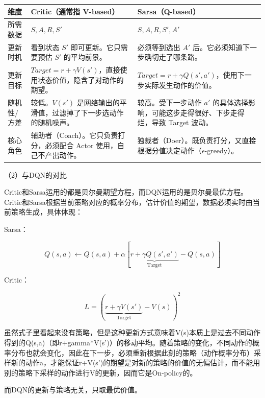 \begin{longtable}[]{@{}
  >{\raggedright\arraybackslash}p{}
  >{\raggedright\arraybackslash}p{}
  >{\raggedright\arraybackslash}p{}@{}}
\toprule
维度 & Critic（通常指 V-based） & Sarsa（Q-based） \\
\midrule
\endhead
所需数据 & \(S,A,R,S'\) & \(S,A,R,S',A'\) \\
更新时机 & 看到状态 \(S'\) 即可更新。它只需要预估 \(S'\) 的平均前景。 & 必须等到选出 \(A'\) 后。它必须知道下一步确切走了哪条路。 \\
更新目标 & \(Target=r+\gamma V(s')\)，直接使用状态价值，隐含了对动作的期望。 & \(Target=r+\gamma Q(s',a')\)，使用下一步实际发生动作的价值。 \\
随机性/方差 & 较低。\(V(s')\) 是网络输出的平滑值，过滤掉了下一步选动作的随机噪声。 & 较高。受下一步动作 \(a'\) 的具体选择影响，可能这步走得很好、下步走得烂，导致 Target 波动。 \\
核心角色 & 辅助者（Coach）。它只负责打分，必须配合 Actor 使用，自己不产出动作。 & 独裁者（Doer）。既负责打分，又直接根据分值决定动作（\(\epsilon\)-greedy）。 \\
\bottomrule
\end{longtable}

（2）与DQN的对比

Critic和Sarsa运用的都是贝尔曼期望方程，而DQN运用的是贝尔曼最优方程。Critic和Sarsa根据当前策略对应的概率分布，估计价值的期望，数据必须实时由当前策略生成，具体体现：

Sarsa：

\[
Q(s,a)\leftarrow Q(s,a)+\alpha\left[\underbrace{r+\gamma Q(s',a')}_{\text{Target}}-Q(s,a)\right]
\]

Critic：

\[
L=\left(\underbrace{r+\gamma V(s')}_{\text{Target}}-V(s)\right)^2
\]

虽然式子里看起来没有策略，但是这种更新方式意味着V(s)本质上是过去不同动作得到的Q(s,a)（即r+gamma*V(s')）的移动平均。随着策略的变化，不同动作的概率分布也就会变化，因此在下一步，必须重新根据此刻的策略（动作概率分布）采样新的动作a，才能保证r+V(s')的期望是对新的策略的价值的无偏估计，而不能用别的策略下采样的动作进行V的更新，因而它是On-policy的。

而DQN的更新与策略无关，只取最优价值。

